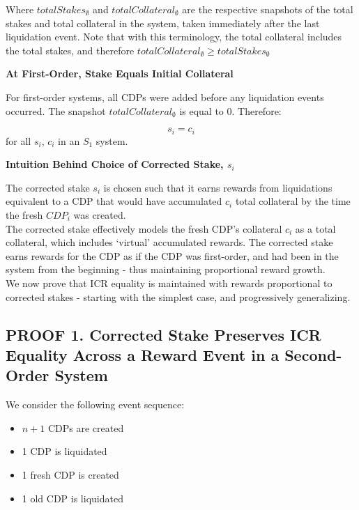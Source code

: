 \documentclass[reqno]{article}
\begin{document}
\bigskip
Where $totalStakes_\emptyset$ and $totalCollateral_\emptyset$ are the respective snapshots of the total stakes and total collateral in the system, taken immediately after the last liquidation event. Note that with this terminology, the total collateral includes the total stakes, and therefore $totalCollateral_\emptyset \ge totalStakes_\emptyset$

\bigskip
\textbf{At First-Order, Stake Equals Initial Collateral}

For first-order systems, all CDPs were added before any liquidation events occurred. The snapshot $totalCollateral_\emptyset$ is equal to 0. Therefore:

\begin{equation} 
    s_i=c_i
\end{equation}
for all $s_i$, $c_i$ in an $S_1$ system.

\bigskip
\textbf{Intuition Behind Choice of Corrected Stake, $s_i$}

The corrected stake $s_i$ is chosen such that it earns rewards from liquidations equivalent to a CDP that would have accumulated $c_i$ total collateral by the time the fresh $CDP_i$ was created.\\

The corrected stake effectively models the fresh CDP’s collateral $c_i$ as a total collateral, which includes ‘virtual’ accumulated rewards. The corrected stake earns rewards for the CDP as if the CDP was first-order, and had been in the system from the beginning - thus maintaining proportional reward growth.\\

We now prove that ICR equality is maintained with rewards proportional to corrected stakes - starting with the simplest case, and progressively generalizing.

\bigskip
\subsection*{\textbf{PROOF 1. Corrected Stake Preserves ICR Equality Across a Reward Event in a Second-Order System}}

We consider the following event sequence:

\begin{itemize}
  \item $n+1$ CDPs are created
  \item 1 CDP is liquidated
  \item 1 fresh CDP is created
  \item 1 old CDP is liquidated
\end{itemize}
\end{document}
